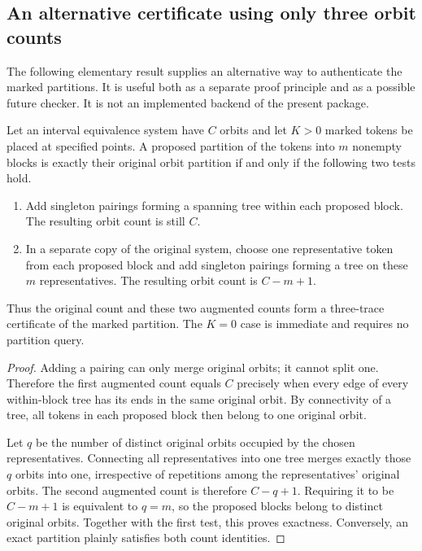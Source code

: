 \subsection{An alternative certificate using only three orbit counts}
\label{int:three-count}

The following elementary result supplies an alternative way to authenticate
the marked partitions.  It is useful both as a separate proof principle and
as a possible future checker.  It is not an implemented backend of the
present package.

\begin{theorem}
\label{int:partition-certificate}
Let an interval equivalence system have $C$ orbits and let $K>0$ marked
tokens be placed at specified points.  A proposed partition of the tokens
into $m$ nonempty blocks is exactly their original orbit partition if and
only if the following two tests hold.
\begin{enumerate}
\item Add singleton pairings forming a spanning tree within each proposed
block.  The resulting orbit count is still $C$.
\item In a separate copy of the original system, choose one representative
token from each proposed block and add singleton pairings forming a tree
on these $m$ representatives.  The resulting orbit count is $C-m+1$.
\end{enumerate}
Thus the original count and these two augmented counts form a three-trace
certificate of the marked partition.  The $K=0$ case is immediate and
requires no partition query.
\end{theorem}

\begin{proof}
Adding a pairing can only merge original orbits; it cannot split one.
Therefore the first augmented count equals $C$ precisely when every edge
of every within-block tree has its ends in the same original orbit.  By
connectivity of a tree, all tokens in each proposed block then belong to
one original orbit.

Let $q$ be the number of distinct original orbits occupied by the chosen
representatives.  Connecting all representatives into one tree merges
exactly those $q$ orbits into one, irrespective of repetitions among the
representatives' original orbits.  The second augmented count is therefore
$C-q+1$.  Requiring it to be $C-m+1$ is equivalent to $q=m$, so the proposed
blocks belong to distinct original orbits.  Together with the first test,
this proves exactness.  Conversely, an exact partition plainly satisfies
both count identities.
\end{proof}

